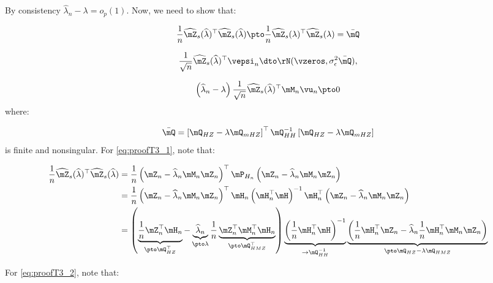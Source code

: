 \begin{subappendices}
By consistency $\widehat{\lambda}_n- \lambda = o_p(1)$. Now, we need to show that: 

\begin{equation}\label{eq:proofT3_1}
  \frac{1}{n}\widehat{\mZ}_s(\widehat{\lambda})^\top\widehat{\mZ}_s(\widehat{\lambda})\pto \frac{1}{n}\widehat{\mZ}_s(\lambda)^\top\widehat{\mZ}_s(\lambda) = \bar{\mQ}
\end{equation}

\begin{equation}\label{eq:proofT3_2}
  \frac{1}{\sqrt{n}}\widehat{\mZ}_s(\widehat{\lambda})^\top\vepsi_n\dto \rN(\vzeros, \sigma^2_{\epsilon}\bar{\mQ}),
\end{equation}

\begin{equation}\label{eq:proofT3_3}
\left(\widehat{\lambda}_n- \lambda\right)\frac{1}{\sqrt{n}}\widehat{\mZ}_s(\widehat{\lambda})^\top\mM_n\vu_n \pto 0
\end{equation}
%
where:

\begin{equation}
  \bar{\mQ} = \left[\mQ_{HZ} - \lambda \mQ_{mHZ}\right]^\top \mQ_{HH}^{-1}\left[\mQ_{HZ} - \lambda \mQ_{mHZ}\right]
\end{equation}
%
is finite and nonsingular. For \ref{eq:proofT3_1}, note that:

\begin{equation}
\begin{aligned}
  \frac{1}{n}\widehat{\mZ}_s(\widehat{\lambda})^\top\widehat{\mZ}_s(\widehat{\lambda}) & = \frac{1}{n}\left(\mZ_n - \widehat{\lambda}_n\mM_n\mZ_n\right)^\top\mP_{H_n}\left(\mZ_n - \widehat{\lambda}_n\mM_n\mZ_n\right) \\
  & =  \frac{1}{n}\left(\mZ_n - \widehat{\lambda}_n\mM_n\mZ_n\right)^\top\mH_n\left(\mH_n^\top\mH\right)^{-1}\mH_n^\top\left(\mZ_n - \widehat{\lambda}_n\mM_n\mZ_n\right) \\
  & =  \left(\underbrace{\frac{1}{n}\mZ_n^\top \mH_n}_{\pto \mQ_{HZ}^\top} - \underbrace{\widehat{\lambda}_n}_{\pto \lambda}\frac{1}{n}\underbrace{\mZ_n^\top\mM_n^\top\mH_n}_{\pto \mQ_{HMZ}^\top}\right)\underbrace{\left(\frac{1}{n}\mH_n^\top\mH\right)^{-1}}_{\to \mQ_{HH}^{-1}}\underbrace{\left(\frac{1}{n}\mH_n^\top\mZ_n  - \widehat{\lambda}_n\frac{1}{n}\mH_n^\top\mM_n\mZ_n\right)}_{\pto \mQ_{HZ}-\lambda\mQ_{HMZ}}
\end{aligned}
\end{equation}

For \ref{eq:proofT3_2}, note that:


\end{subappendices}
